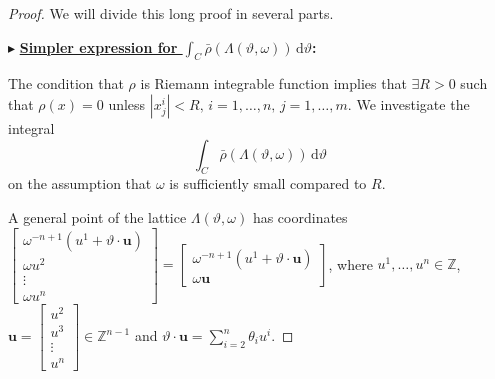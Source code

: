\documentclass[11pt]{article}
\theoremstyle{definition}
\theoremstyle{proof}
\begin{document}
\begin{proof}
    We will divide this long proof in several parts.

    $\blacktriangleright$ \textbf{\uline{Simpler expression for $\int_{C}\bar{\rho }(\Lambda (\vartheta ,\omega )) \, \mathrm{d} \vartheta $}:}

    The condition that $\rho$ is Riemann integrable function implies that $\exists R >0$ such that $\rho (x) = 0$ unless $|x^i_j| < R , \, i = 1, \ldots, n, \, j = 1, \ldots, m$.
    We investigate the integral
    \[
        \int_{C} \bar{\rho} (\Lambda (\vartheta , \omega )) \,  \mathrm{d} \vartheta 
    \]
    on the assumption that $\omega$ is sufficiently small compared to $R$.

    A general point of the lattice $\Lambda (\vartheta , \omega )$ has coordinates $
    \begin{bmatrix}
        \omega ^{-n+1} (u^1 + \vartheta \cdot \bm{u}) \\
        \omega u^2 \\
        \vdots \\
        \omega u^n
    \end{bmatrix} = 
    \begin{bmatrix}
        \omega ^{-n+1} (u^1 + \vartheta \cdot \bm{u}) \\
        \omega \bm{u} 
    \end{bmatrix}
    $, where $u^1, \ldots , u^n \in \mathbb{Z}$, $\bm{u} =
    \begin{bmatrix}
        u^2 \\
        u^3 \\
        \vdots \\
        u^n
    \end{bmatrix}
    \in \mathbb{Z}^{n-1}$ and $\vartheta \cdot \bm{u} = \displaystyle\sum_{i=2}^{n} \theta _i u^i$.


\end{proof}
\end{document}
